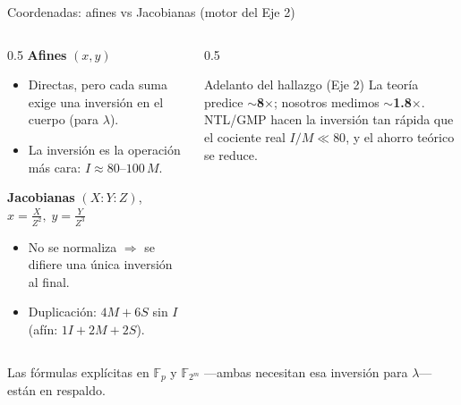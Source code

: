 \documentclass[aspectratio=169,11pt]{beamer}
\begin{document}
\begin{frame}{Coordenadas: afines vs Jacobianas (motor del Eje 2)}
  \small
  \begin{columns}[t]
    \begin{column}{0.5\textwidth}
      \textbf{Afines} $(x,y)$
      \begin{itemize}\footnotesize
        \item Directas, pero \alert{cada suma exige una inversión} en el cuerpo (para $\lambda$).
        \item La inversión es la operación \alert{más cara}: $I\approx 80\text{--}100\,M$.
      \end{itemize}
      \vspace{0.4ex}
      \textbf{Jacobianas} $(X:Y:Z)$,\; $x=\tfrac{X}{Z^2},\; y=\tfrac{Y}{Z^3}$
      \begin{itemize}\footnotesize
        \item No se normaliza $\Rightarrow$ se \alert{difiere una única inversión al final}.
        \item Duplicación: $4M+6S$ \alert{sin $I$} (afín: $1I+2M+2S$).
      \end{itemize}
    \end{column}
    \begin{column}{0.5\textwidth}
      \begin{alertblock}{Adelanto del hallazgo (Eje 2)}
        \footnotesize La teoría predice $\sim$\textbf{8}$\times$; nosotros medimos
        $\sim$\textbf{1.8}$\times$.\\[0.5ex]
        NTL/GMP hacen la inversión tan rápida que el cociente real $I/M \ll 80$, y el
        ahorro teórico se reduce.
      \end{alertblock}
    \end{column}
  \end{columns}
  \vfill
  \footnotesize Las fórmulas explícitas en $\mathbb{F}_p$ y $\mathbb{F}_{2^m}$ —ambas
  necesitan esa inversión para $\lambda$— están en respaldo.
\end{frame}
\end{document}
